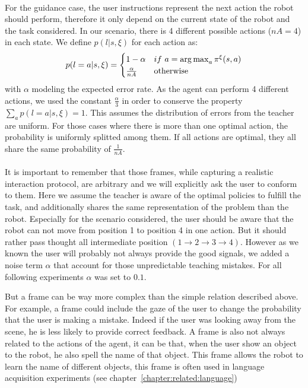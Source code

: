 \paragraph{} For the guidance case, the user instructions represent the next action the robot should perform, therefore it only depend on the current state of the robot and the task considered. In our scenario, there is 4 different possible actions ($nA = 4$) in each state. We define $p(l |s, \xi)$ for each action as:
%
\begin{equation}
    p(l = a |s,\xi) = 
    \begin{cases}
        1-\alpha & if~a = \argmax_a \pi^{\xi}(s,a)\\
        \frac{\alpha}{nA} & \text{otherwise}\\
   \end{cases}
\end{equation}
%
with $\alpha$ modeling the expected error rate. As the agent can perform 4 different actions, we used the constant $\frac{\alpha}{3}$ in order to conserve the property $\sum_a p(l = a |s,\xi) = 1$. This assumes the distribution of errors from the teacher are uniform. For those cases where there is more than one optimal action, the probability is uniformly splitted among them. If all actions are optimal, they all share the same probability of $\frac{1}{nA}$.

\paragraph{} It is important to remember that those frames, while capturing a realistic interaction protocol, are arbitrary and we will explicitly ask the user to conform to them. Here we assume the teacher is aware of the optimal policies to fulfill the task, and additionally shares the same representation of the problem than the robot. Especially for the scenario considered, the user should be aware that the robot can not move from position 1 to position 4 in one action. But it should rather pass thought all intermediate position $(1 \rightarrow 2 \rightarrow 3 \rightarrow 4)$. However as we known the user will probably not always provide the good signals, we added a noise term $\alpha$ that account for those unpredictable teaching mistakes. For all following experiments $\alpha$ was set to $0.1$.

But a frame can be way more complex than the simple relation described above. For example, a frame could include the gaze of the user to change the probability that the user is making a mistake. Indeed if the user was looking away from the scene, he is less likely to provide correct feedback. A frame is also not always related to the actions of the agent, it can be that, when the user show an object to the robot, he also spell the name of that object. This frame allows the robot to learn the name of different objects, this frame is often used in language acquisition experiments (see chapter~\ref{chapter:related:language})

